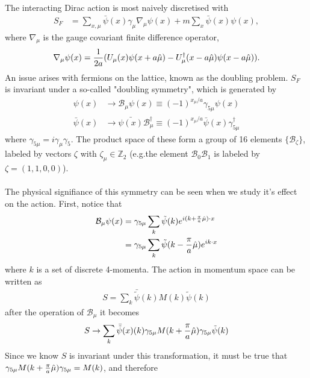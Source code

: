 The interacting Dirac action is most naively discretised with
\begin{align}
 S_F &= \sum_{x,\mu} \bar{\psi}(x) \gamma_{\mu} \nabla_{\mu} \psi(x) + m\sum_x \bar{\psi}(x) \psi(x),
 \label{eq:naivefermions}
\end{align}
where $\nabla_{\mu}$ is the gauge covariant finite difference operator,
\begin{align}	
	\nabla_{\mu} \psi(x) = {1\over 2a} ( U_{\mu} (x) \psi(x+a\hat{\mu}) - U^{\dagger}_{\mu}(x-a\hat{\mu})\psi(x-a\hat{\mu}) ).
\label{eq:lat_derivative}
\end{align}
An issue arises with fermions on the lattice, known as the doubling problem. $S_F$ is invariant under a so-called "doubling symmetry", which is generated by
\begin{align}
	\label{eq:doublingsymmetry}
	\psi(x) & \to \mathcal{B}_{\mu} \psi(x) \equiv  (-1)^{x_{\mu}/a} \gamma_{5\mu} \psi(x) \\
	\bar{\psi}(x) & \to \bar{\psi(x)}\mathcal{B}^{\dagger}_{\mu} \equiv (-1)^{x_{\mu}/a} \bar{\psi}(x) \gamma^{\dagger}_{5\mu}
\end{align}
where $\gamma_{5\mu} = i\gamma_{\mu}\gamma_5$. The product space of these form a group of 16 elements $\{\mathcal{B}_{\zeta}\}$, labeled  by vectors $\zeta$ with $\zeta_{\mu}\in \mathbb{Z}_2$ (e.g.the element $\mathcal{B}_{0}\mathcal{B}_{1}$ is labeled by $\zeta=(1,1,0,0)$).
\\ \\
The physical signifiance of this symmetry can be seen when we study it's effect on the action. First, notice that
\begin{align}
	\mathcal{B}_{\mu} \psi(x) & = \gamma_{5\mu} \sum_k \tilde{\psi}(k) e^{i(k+{\pi\over a}\hat{\mu})\cdot x} \\
	& = \gamma_{5\mu} \sum_k \tilde{\psi}(k-{\pi\over a}\hat{\mu})e^{ik\cdot x}
\end{align}
where $k$ is a set of discrete 4-momenta. The action in momentum space can be written as
\begin{align}
	S = \sum_k \bar{\tilde{\psi}}(k) M(k) \tilde{\psi}(k)
\end{align}
after the operation of $\mathcal{B}_{\mu}$ it becomes
\begin{align}
	S \to \sum_k \bar{\tilde{\psi}}(x)(k) \gamma_{5\mu} M(k+{\pi\over a}\hat{\mu})\gamma_{5\mu} \tilde{\psi}(k)
\end{align}
Since we know $S$ is invariant under this transformation, it must be true that $\gamma_{5\mu} M(k+{\pi\over a}\hat{\mu})\gamma_{5\mu} = M(k)$, and therefore
